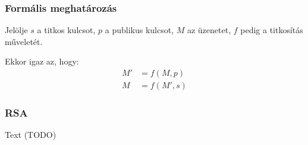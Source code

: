 \documentclass{beamer}
\begin{document}
\begin{frame}
    \frametitle{Formális meghatározás}

    Jelölje $s$ a titkos kulcsot, $p$ a publikus kulcsot, $M$ az üzenetet, $f$ pedig a titkosítás műveletét.

    Ekkor igaz az, hogy:
    \begin{align*}
        M' & = f(M, p)  \\
        M  & = f(M', s)
    \end{align*}
\end{frame}

\begin{frame}
    \frametitle{RSA}

    Text (TODO)
\end{frame}
\end{document}
